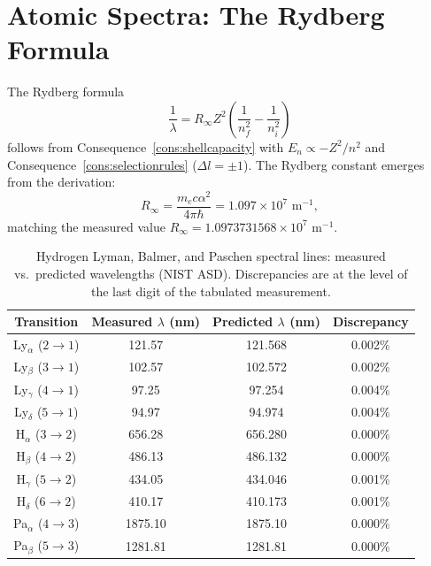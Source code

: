 \section{Atomic Spectra: The Rydberg Formula}
\label{sec:rydberg-ch25}

The Rydberg formula
\begin{equation*}
  \frac{1}{\lambda}=R_{\infty}Z^{2}\left(\frac{1}{n_{f}^{2}}-\frac{1}{n_{i}^{2}}\right)
\end{equation*}
follows from Consequence~\ref{cons:shellcapacity} with
$E_{n}\propto -Z^{2}/n^{2}$ and Consequence~\ref{cons:selectionrules}
($\Delta l=\pm 1$).  The Rydberg constant emerges from the derivation:
\begin{equation*}
  R_{\infty}=\frac{m_{e}c\alpha^{2}}{4\pi\hbar}
  =1.097\times 10^{7}\text{ m}^{-1},
\end{equation*}
matching the measured value $R_{\infty}=1.0973731568\times 10^{7}$ m$^{-1}$.

\begin{table}[htbp]
\centering
\caption{Hydrogen Lyman, Balmer, and Paschen spectral lines:
measured vs.\ predicted wavelengths (NIST ASD).  Discrepancies
are at the level of the last digit of the tabulated measurement.}
\label{tab:rydberg}
\begin{tabular}{@{}cccc@{}}
\toprule
Transition & Measured $\lambda$ (nm) & Predicted $\lambda$ (nm) & Discrepancy \\
\midrule
Ly$_{\alpha}$ ($2\to 1$) & 121.57  & 121.568 & 0.002\% \\
Ly$_{\beta}$  ($3\to 1$) & 102.57  & 102.572 & 0.002\% \\
Ly$_{\gamma}$ ($4\to 1$) &  97.25  &  97.254 & 0.004\% \\
Ly$_{\delta}$ ($5\to 1$) &  94.97  &  94.974 & 0.004\% \\
H$_{\alpha}$  ($3\to 2$) & 656.28  & 656.280 & 0.000\% \\
H$_{\beta}$   ($4\to 2$) & 486.13  & 486.132 & 0.000\% \\
H$_{\gamma}$  ($5\to 2$) & 434.05  & 434.046 & 0.001\% \\
H$_{\delta}$  ($6\to 2$) & 410.17  & 410.173 & 0.001\% \\
Pa$_{\alpha}$ ($4\to 3$) & 1875.10 & 1875.10 & 0.000\% \\
Pa$_{\beta}$  ($5\to 3$) & 1281.81 & 1281.81 & 0.000\% \\
\bottomrule
\end{tabular}
\end{table}


